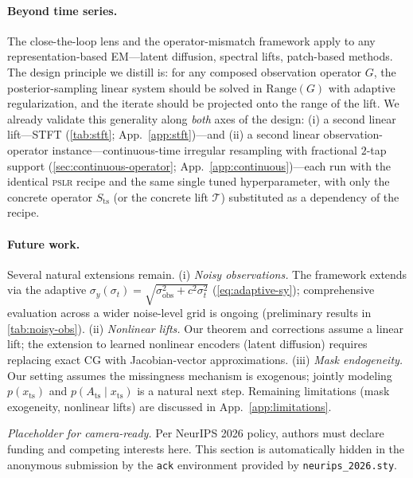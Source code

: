 \documentclass{article}
\theoremstyle{plain}
\theoremstyle{definition}
\theoremstyle{remark}
\newcommand{\tsimg}{\mathcal{T}}
\newcommand{\pslr}{\textsc{pslr}}
\newcommand{\Ats}{A_{\mathrm{ts}}}
\newcommand{\xts}{x_{\mathrm{ts}}}
\begin{document}
\paragraph{Beyond time series.}
The close-the-loop lens and the operator-mismatch framework apply to any representation-based EM---latent diffusion, spectral lifts, patch-based methods. The design principle we distill is: for any composed observation operator $G$, the posterior-sampling linear system should be solved in $\mathrm{Range}(G)$ with adaptive regularization, and the iterate should be projected onto the range of the lift. We already validate this generality along \emph{both} axes of the design: (i) a second linear lift---STFT (\cref{tab:stft}; App.~\ref{app:stft})---and (ii) a second linear observation-operator instance---continuous-time irregular resampling with fractional $2$-tap support (\cref{sec:continuous-operator}; App.~\ref{app:continuous})---each run with the identical \pslr{} recipe and the same single tuned hyperparameter, with only the concrete operator $S_{\mathrm{ts}}$ (or the concrete lift $\tsimg$) substituted as a dependency of the recipe.

\paragraph{Future work.}
Several natural extensions remain. (i) \emph{Noisy observations.} The framework extends via the adaptive $\sigma_y(\sigma_t) = \sqrt{\sigma_{\mathrm{obs}}^2 + c^2 \sigma_t^2}$ (\cref{eq:adaptive-sy}); comprehensive evaluation across a wider noise-level grid is ongoing (preliminary results in \cref{tab:noisy-obs}). (ii) \emph{Nonlinear lifts.} Our theorem and corrections assume a linear lift; the extension to learned nonlinear encoders (latent diffusion) requires replacing exact CG with Jacobian-vector approximations. (iii) \emph{Mask endogeneity.} Our setting assumes the missingness mechanism is exogenous; jointly modeling $p(\xts)$ and $p(\Ats \mid \xts)$ is a natural next step. Remaining limitations (mask exogeneity, nonlinear lifts) are discussed in App.~\ref{app:limitations}.

\begin{ack}
\emph{Placeholder for camera-ready.} Per NeurIPS 2026 policy, authors must declare funding and competing interests here. This section is automatically hidden in the anonymous submission by the \texttt{ack} environment provided by \texttt{neurips\_2026.sty}.
\end{ack}
\end{document}
